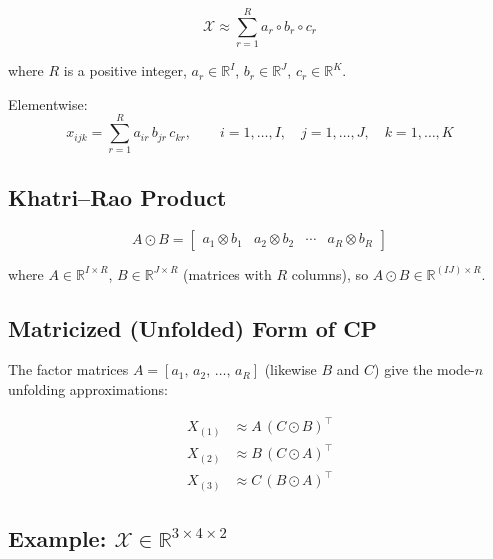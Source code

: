 \documentclass[12pt]{article}
\newcommand{\T}[1]{\mathcal{#1}}   %
\begin{document}
\begin{equation}
\T{X} \approx \sum_{r=1}^{R} a_r \circ b_r \circ c_r
\end{equation}

where $R$ is a positive integer,
$a_r \in \mathbb{R}^{I}$, $b_r \in \mathbb{R}^{J}$, $c_r \in \mathbb{R}^{K}$.

\medskip
\noindent Elementwise:
\begin{equation}
x_{ijk} = \sum_{r=1}^{R} a_{ir}\, b_{jr}\, c_{kr},
\qquad
i = 1, \ldots, I,\quad j = 1, \ldots, J,\quad k = 1, \ldots, K
\end{equation}

\subsection{Khatri--Rao Product}

\begin{equation}
A \odot B
= \begin{bmatrix} a_1 \otimes b_1 & a_2 \otimes b_2 & \cdots & a_R \otimes b_R \end{bmatrix}
\end{equation}

where $A \in \mathbb{R}^{I \times R}$, $B \in \mathbb{R}^{J \times R}$ (matrices with $R$ columns),
so $A \odot B \in \mathbb{R}^{(IJ) \times R}$.

\subsection{Matricized (Unfolded) Form of CP}

The factor matrices $A = [a_1,\, a_2,\, \ldots,\, a_R]$
(likewise $B$ and $C$) give the mode-$n$ unfolding approximations:

\begin{align}
X_{(1)} &\approx A\,(C \odot B)^{\top} \\[4pt]
X_{(2)} &\approx B\,(C \odot A)^{\top} \\[4pt]
X_{(3)} &\approx C\,(B \odot A)^{\top}
\end{align}

\subsection{Example: $\T{X} \in \mathbb{R}^{3 \times 4 \times 2}$}
\end{document}

